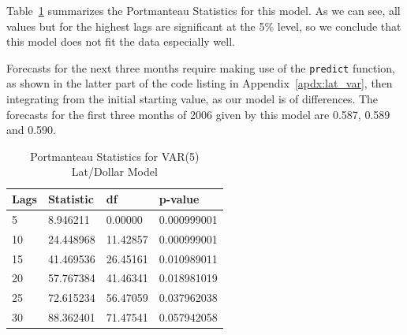 \documentclass{article}
\begin{document}
Table~\ref{tbl:var_portmanteau} summarizes the Portmanteau Statistics
for this model. As we can see, all values but for the highest lags are
significant at the 5\% level, so we conclude that this model does not
fit the data especially well.

Forecasts for the next three months require making use of the
\texttt{predict} function, as shown in the latter part of the code
listing in Appendix~\ref{apdx:lat_var}, then integrating from the
initial starting value, as our model is of differences. The forecasts
for the first three months of 2006 given by this model are 0.587,
0.589 and 0.590.


\begin{table}[]
  \centering
  \begin{tabular}{llll}
    \toprule
    Lags & Statistic & df       & p-value     \\
    \midrule
    5    & 8.946211  & 0.00000  & 0.000999001 \\
    10   & 24.448968 & 11.42857 & 0.000999001 \\
    15   & 41.469536 & 26.45161 & 0.010989011 \\
    20   & 57.767384 & 41.46341 & 0.018981019 \\
    25   & 72.615234 & 56.47059 & 0.037962038 \\
    30   & 88.362401 & 71.47541 & 0.057942058 \\
    \bottomrule
  \end{tabular}
  \caption{Portmanteau Statistics for VAR(5) Lat/Dollar Model}\label{tbl:var_portmanteau}
\end{table}
\end{document}
